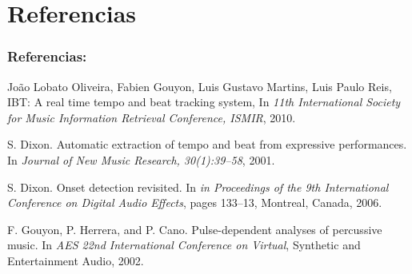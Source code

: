 \documentclass[slidestop,compress,mathserif,xcolor=svgnames,table,xcolor=dvipsnames]{beamer}
\begin{document}
\section{Referencias}
\begin{frame}
\frametitle{Referencias:}
\begin{thebibliography}{99}
\begin{small}

Jo\~ao Lobato Oliveira, Fabien Gouyon, Luis Gustavo Martins, Luis Paulo Reis, IBT: A real time tempo and beat tracking system, In \emph{11th International Society for Music Information Retrieval Conference, ISMIR}, 2010.

S. Dixon. Automatic extraction of tempo and beat from
expressive performances. In \emph{Journal of New Music Research, 30(1):39–58}, 2001.

S. Dixon. Onset detection revisited. In \emph{in Proceedings of the 9th International Conference on Digital Audio Effects}, pages 133–13, Montreal, Canada, 2006.

F. Gouyon, P. Herrera, and P. Cano. Pulse-dependent analyses of percussive music. In \emph{AES 22nd International Conference on Virtual}, Synthetic and Entertainment Audio, 2002.

\end{small}
\end{thebibliography}
\end{frame}
\end{document}
